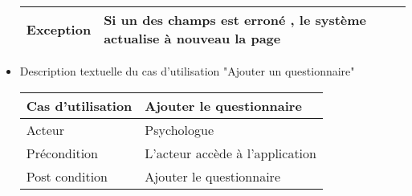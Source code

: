 \documentclass[12]{article}
\begin{document}
\begin{itemize}
\begin{tabular}{|l|l|}
Exception         & Si un des champs est erroné , le système actualise à nouveau la page                                                                                                                                                                                                                                                       \\ \hline
\end{tabular}





\item Description textuelle du cas d'utilisation "Ajouter un questionnaire"






\begin{tabular}{|l|l|}
\hline
Cas d'utilisation & Ajouter le questionnaire                                                                                                                                                                                                                                                                                                                                                                           \\ \hline
Acteur            & Psychologue                                                                                                                                                                                                                                                                                                                                                                                        \\ \hline
Précondition      & L'acteur accède à l'application                                                                                                                                                                                                                                                                                                                                                                    \\ \hline
Post condition    & Ajouter le questionnaire                                                                                                                                                                                                                                                                                                                                                                           \\ \hline

\end{tabular}
\end{itemize}
\end{document}
